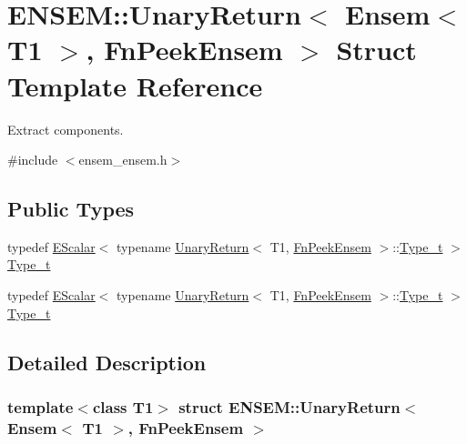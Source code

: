 \hypertarget{structENSEM_1_1UnaryReturn_3_01Ensem_3_01T1_01_4_00_01FnPeekEnsem_01_4}{}\section{E\+N\+S\+EM\+:\+:Unary\+Return$<$ Ensem$<$ T1 $>$, Fn\+Peek\+Ensem $>$ Struct Template Reference}
\label{structENSEM_1_1UnaryReturn_3_01Ensem_3_01T1_01_4_00_01FnPeekEnsem_01_4}


Extract components.  




{\ttfamily \#include $<$ensem\+\_\+ensem.\+h$>$}

\subsection*{Public Types}
\begin{DoxyCompactItemize}
\item 
typedef \mbox{\hyperlink{classENSEM_1_1EScalar}{E\+Scalar}}$<$ typename \mbox{\hyperlink{structENSEM_1_1UnaryReturn}{Unary\+Return}}$<$ T1, \mbox{\hyperlink{structENSEM_1_1FnPeekEnsem}{Fn\+Peek\+Ensem}} $>$\+::\mbox{\hyperlink{structENSEM_1_1UnaryReturn_3_01Ensem_3_01T1_01_4_00_01FnPeekEnsem_01_4_a3bb59903a0e3c8d5e4b6ce0ac99c5454}{Type\+\_\+t}} $>$ \mbox{\hyperlink{structENSEM_1_1UnaryReturn_3_01Ensem_3_01T1_01_4_00_01FnPeekEnsem_01_4_a3bb59903a0e3c8d5e4b6ce0ac99c5454}{Type\+\_\+t}}
\item 
typedef \mbox{\hyperlink{classENSEM_1_1EScalar}{E\+Scalar}}$<$ typename \mbox{\hyperlink{structENSEM_1_1UnaryReturn}{Unary\+Return}}$<$ T1, \mbox{\hyperlink{structENSEM_1_1FnPeekEnsem}{Fn\+Peek\+Ensem}} $>$\+::\mbox{\hyperlink{structENSEM_1_1UnaryReturn_3_01Ensem_3_01T1_01_4_00_01FnPeekEnsem_01_4_a3bb59903a0e3c8d5e4b6ce0ac99c5454}{Type\+\_\+t}} $>$ \mbox{\hyperlink{structENSEM_1_1UnaryReturn_3_01Ensem_3_01T1_01_4_00_01FnPeekEnsem_01_4_a3bb59903a0e3c8d5e4b6ce0ac99c5454}{Type\+\_\+t}}
\end{DoxyCompactItemize}


\subsection{Detailed Description}
\subsubsection*{template$<$class T1$>$\newline
struct E\+N\+S\+E\+M\+::\+Unary\+Return$<$ Ensem$<$ T1 $>$, Fn\+Peek\+Ensem $>$}

